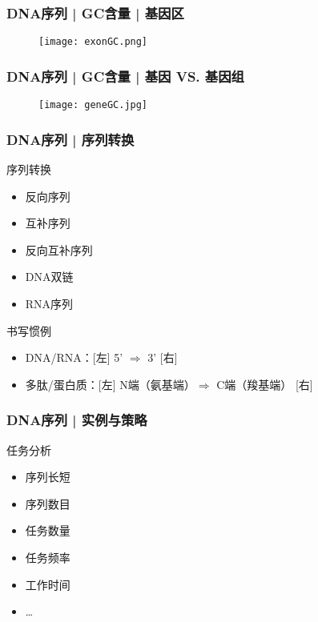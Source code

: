 \begin{frame}
	\frametitle{DNA序列 | GC含量 | 基因区}
	\begin{figure}
		\centering
		\texttt{[image: exonGC.png]}
	\end{figure}
\end{frame}

\begin{frame}
	\frametitle{DNA序列 | GC含量 | 基因 VS. 基因组}
	\begin{figure}
		\centering
		\texttt{[image: geneGC.jpg]}
	\end{figure}
\end{frame}

\begin{frame}
	\frametitle{DNA序列 | 序列转换}
	\begin{block}{序列转换}
		\begin{itemize}
			\item 反向序列
			\item 互补序列
			\item 反向互补序列
			\item DNA双链
			\item RNA序列
		\end{itemize}
	\end{block}
	\pause
	\begin{block}{书写惯例}
		\begin{itemize}
			\item DNA/RNA：[左] 5' $\Longrightarrow$ 3' [右]
			\item 多肽/蛋白质：[左] N端（氨基端）$\Longrightarrow$ C端（羧基端） [右]
		\end{itemize}
	\end{block}
\end{frame}

\begin{frame}
	\frametitle{DNA序列 | 实例与策略}
	\begin{block}{任务分析}
		\begin{itemize}
			\item 序列长短
			\item 序列数目
			\item 任务数量
			\item 任务频率
			\item 工作时间
			\item \ldots
		\end{itemize}
	\end{block}
\end{frame}

